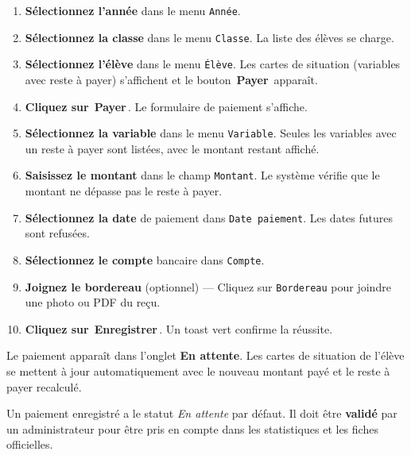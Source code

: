\documentclass[12pt,a4paper]{report}
\newcommand{\bouton}[1]{{\colorbox{emerald}{\small\sffamily\bfseries\color{white}\,#1\,}}}
\newcommand{\champ}[1]{\texttt{\color{violet}#1}}
\begin{document}
\begin{etape}[title=Proc\'edure d\'etaill\'ee : Enregistrer un paiement]
\begin{enumerate}[leftmargin=1.5cm,label=\textbf{\arabic*.},itemsep=12pt]
  \item \textbf{S\'electionnez l'ann\'ee} dans le menu \champ{Ann\'ee}.
  \item \textbf{S\'electionnez la classe} dans le menu \champ{Classe}. La liste des \'el\`eves se charge.
  \item \textbf{S\'electionnez l'\'el\`eve} dans le menu \champ{\'El\`eve}. Les cartes de situation (variables avec reste \`a payer) s'affichent et le bouton \bouton{Payer} appara\^it.
  \item \textbf{Cliquez sur} \bouton{Payer}. Le formulaire de paiement s'affiche.
  \item \textbf{S\'electionnez la variable} dans le menu \champ{Variable}. Seules les variables avec un reste \`a payer sont list\'ees, avec le montant restant affich\'e.
  \item \textbf{Saisissez le montant} dans le champ \champ{Montant}. Le syst\`eme v\'erifie que le montant ne d\'epasse pas le reste \`a payer.
  \item \textbf{S\'electionnez la date} de paiement dans \champ{Date paiement}. Les dates futures sont refus\'ees.
  \item \textbf{S\'electionnez le compte} bancaire dans \champ{Compte}.
  \item \textbf{Joignez le bordereau} (optionnel) --- Cliquez sur \champ{Bordereau} pour joindre une photo ou PDF du re\c{c}u.
  \item \textbf{Cliquez sur} \bouton{Enregistrer}. Un toast vert confirme la r\'eussite.
\end{enumerate}
\end{etape}

\begin{resultat}
Le paiement appara\^it dans l'onglet \textbf{En attente}. Les cartes de situation de l'\'el\`eve se mettent \`a jour automatiquement avec le nouveau montant pay\'e et le reste \`a payer recalcul\'e.
\end{resultat}

\begin{attention}
Un paiement enregistr\'e a le statut \textit{En attente} par d\'efaut. Il doit \^etre \textbf{valid\'e} par un administrateur pour \^etre pris en compte dans les statistiques et les fiches officielles.
\end{attention}
\end{document}
